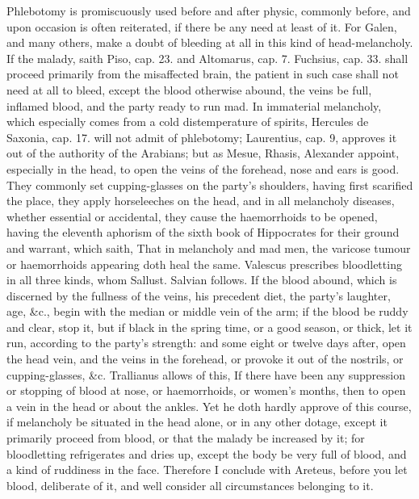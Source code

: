 Phlebotomy is promiscuously used before and after physic, commonly
before, and upon occasion is often reiterated, if there be any need at
least of it. For Galen, and many others, make a doubt of bleeding at
all in this kind of head-melancholy. If the malady, saith Piso, cap.
23. and Altomarus, cap. 7. Fuchsius, cap. 33. shall proceed
primarily from the misaffected brain, the patient in such case shall
not need at all to bleed, except the blood otherwise abound, the veins
be full, inflamed blood, and the party ready to run mad. In immaterial
melancholy, which especially comes from a cold distemperature of
spirits, Hercules de Saxonia, cap. 17. will not admit of phlebotomy;
Laurentius, cap. 9, approves it out of the authority of the Arabians;
but as Mesue, Rhasis, Alexander appoint, especially in the head,
to open the veins of the forehead, nose and ears is good. They commonly
set cupping-glasses on the party's shoulders, having first scarified
the place, they apply horseleeches on the head, and in all melancholy
diseases, whether essential or accidental, they cause the haemorrhoids
to be opened, having the eleventh aphorism of the sixth book of
Hippocrates for their ground and warrant, which saith, That in
melancholy and mad men, the varicose tumour or haemorrhoids appearing
doth heal the same. Valescus prescribes bloodletting in all three
kinds, whom Sallust. Salvian follows. If the blood abound, which
is discerned by the fullness of the veins, his precedent diet, the
party's laughter, age, \&c., begin with the median or middle vein of the
arm; if the blood be ruddy and clear, stop it, but if black in the
spring time, or a good season, or thick, let it run, according to the
party's strength: and some eight or twelve days after, open the head
vein, and the veins in the forehead, or provoke it out of the nostrils,
or cupping-glasses, \&c. Trallianus allows of this, If there have
been any suppression or stopping of blood at nose, or haemorrhoids, or
women's months, then to open a vein in the head or about the ankles.
Yet he doth hardly approve of this course, if melancholy be situated in
the head alone, or in any other dotage, except it primarily
proceed from blood, or that the malady be increased by it; for
bloodletting refrigerates and dries up, except the body be very full of
blood, and a kind of ruddiness in the face. Therefore I conclude with
Areteus, before you let blood, deliberate of it, and well
consider all circumstances belonging to it.

